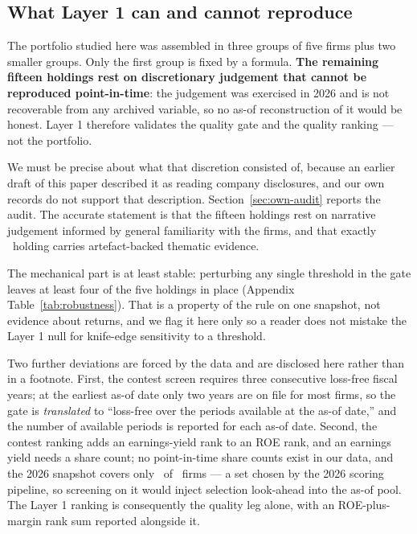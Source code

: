 \documentclass[a4paper,11pt]{article}
\begin{document}
\subsection{What Layer 1 can and cannot reproduce}\label{sec:l1scope}

The portfolio studied here was assembled in three groups of five firms plus two smaller groups. Only
the first group is fixed by a formula. \textbf{The remaining fifteen holdings rest on discretionary
judgement that cannot be reproduced point-in-time}: the judgement was exercised in 2026 and is not
recoverable from any archived variable, so no as-of reconstruction of it would be honest. Layer 1
therefore validates the quality gate and the quality ranking --- not the portfolio.

We must be precise about what that discretion consisted of, because an earlier draft of this paper
described it as reading company disclosures, and our own records do not support that description.
Section~\ref{sec:own-audit} reports the audit. The accurate statement is that the fifteen holdings
rest on narrative judgement informed by general familiarity with the firms, and that exactly
\OwnVerified\ holding carries artefact-backed thematic evidence.

The mechanical part is at least stable: perturbing any single threshold in the gate leaves at least
four of the five holdings in place (Appendix Table~\ref{tab:robustness}). That is a property of the
rule on one snapshot, not evidence about returns, and we flag it here only so a reader does not
mistake the Layer 1 null for knife-edge sensitivity to a threshold.

Two further deviations are forced by the data and are disclosed here rather than in a footnote.
First, the contest screen requires three consecutive loss-free fiscal years; at the earliest as-of
date only two years are on file for most firms, so the gate is \emph{translated} to ``loss-free over
the periods available at the as-of date,'' and the number of available periods is reported for each
as-of date. Second, the contest ranking adds an earnings-yield rank to an ROE rank, and an earnings
yield needs a share count; no point-in-time share counts exist in our data, and the 2026 snapshot
covers only \SatShareCount\ of \SatFirms\ firms --- a set chosen by the 2026 scoring pipeline,
so screening on it
would inject selection look-ahead into the as-of pool. The Layer 1 ranking is consequently the
quality leg alone, with an ROE-plus-margin rank sum reported alongside it.
\end{document}
